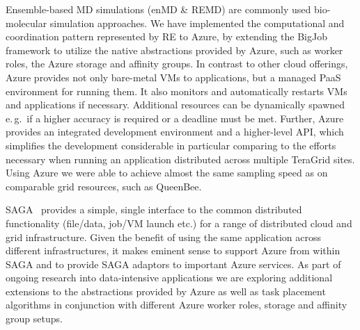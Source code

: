 \documentclass[conference,final]{IEEEtran}
\newcommand{\alnote}[1]{ {\textcolor{blue} { ***AL: #1 }}}
\newcommand{\jhanote}[1]{ {\textcolor{red} { ***SJ: #1 }}}
\newcommand{\alnote}[1]{}
\newcommand{\jhanote}[1]{}
\begin{document}
Ensemble-based MD simulations (enMD \& REMD) are commonly used
bio-molecular simulation approaches.%
We have implemented the computational and coordination pattern
represented by RE to Azure, by extending the BigJob framework to
utilize the native abstractions provided by Azure, such as worker
roles, the Azure storage and affinity groups.
In contrast to other cloud offerings, Azure provides not only
bare-metal VMs to applications, but a managed PaaS environment for
running them. It also monitors and automatically restarts VMs and
applications if necessary. Additional resources can be dynamically
spawned e.\,g.\ if a higher accuracy is required or a deadline must
be met. Further, Azure provides an integrated
development environment and a higher-level API, which simplifies the
development considerable in particular comparing to the efforts
necessary when running an application distributed across multiple
TeraGrid sites.  Using Azure we were able to achieve almost the same
sampling speed as on comparable grid resources, such as QueenBee.

SAGA~\cite{saga_url} provides a simple, single interface to the common
distributed functionality (file/data, job/VM launch etc.) for a range
of distributed cloud and grid infrastructure.  Given the benefit of
using the same application across different infrastructures, it makes
eminent sense to support Azure from within SAGA and to provide SAGA
adaptors to important Azure services.  %
As part of ongoing research into data-intensive applications we are
exploring additional extensions to the abstractions provided by Azure
as well as task placement algorithms in conjunction with different
Azure worker roles, storage and affinity group setups.
  
\end{document}
